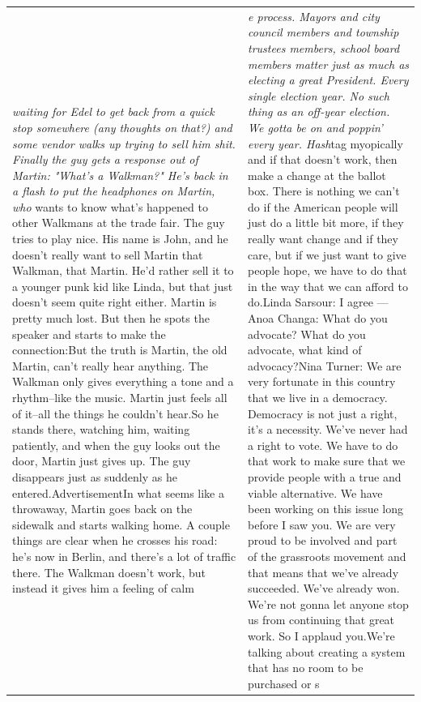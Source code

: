 \documentclass{article}
\begin{document}
\begin{table}[t]
\begin{center}
\begin{tabular}{|p{8cm}|p{8cm}|}
\hline
 \textit{waiting for Edel to get back from a quick stop somewhere (any thoughts on that?) and some vendor walks up trying to sell him shit. Finally the guy gets a response out of Martin: "What's a Walkman?" He's back in a flash to put the headphones on Martin, who} wants to know what's happened to other Walkmans at the trade fair. The guy tries to play nice. His name is John, and he doesn't really want to sell Martin that Walkman, that Martin. He'd rather sell it to a younger punk kid like Linda, but that just doesn't seem quite right either. Martin is pretty much lost. But then he spots the speaker and starts to make the connection:\newline{}But the truth is Martin, the old Martin, can't really hear anything. The Walkman only gives everything a tone and a rhythm--like the music. Martin just feels all of it--all the things he couldn't hear.\newline{}So he stands there, watching him, waiting patiently, and when the guy looks out the door, Martin just gives up. The guy disappears just as suddenly as he entered.\newline{}Advertisement\newline{}In what seems like a throwaway, Martin goes back on the sidewalk and starts walking home. A couple things are clear when he crosses his road: he's now in Berlin, and there's a lot of traffic there. The Walkman doesn't work, but instead it gives him a feeling of calm &
\textit{e process. Mayors and city council members and township trustees members, school board members matter just as much as electing a great President. Every single election year. No such thing as an off-year election. We gotta be on and poppin' every year. Hash}tag myopically and if that doesn't work, then make a change at the ballot box. There is nothing we can't do if the American people will just do a little bit more, if they really want change and if they care, but if we just want to give people hope, we have to do that in the way that we can afford to do.\newline{}Linda Sarsour: I agree —\newline{}Anoa Changa: What do you advocate? What do you advocate, what kind of advocacy?\newline{}Nina Turner: We are very fortunate in this country that we live in a democracy. Democracy is not just a right, it's a necessity. We've never had a right to vote. We have to do that work to make sure that we provide people with a true and viable alternative. We have been working on this issue long before I saw you. We are very proud to be involved and part of the grassroots movement and that means that we've already succeeded. We've already won. We're not gonna let anyone stop us from continuing that great work. So I applaud you.\newline{}We're talking about creating a system that has no room to be purchased or s \\

\end{tabular}
\end{center}
\end{table}
\end{document}

